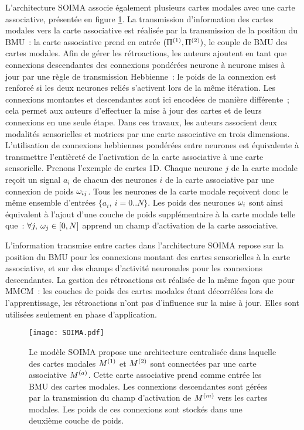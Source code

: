 \documentclass[../main]{subfiles}
\begin{document}
L'architecture SOIMA \parencite{escobar-juarez_self-organized_2016} associe également plusieurs cartes modales avec une carte associative, présentée en figure \ref{fig:SOIMA}.
La transmission d'information des cartes modales vers la carte associative est réalisée par la transmission de la position du BMU~: la carte associative prend en entrée $(\Pi^{({1})},\Pi^{({2})})$, le couple de BMU des cartes modales. 
Afin de gérer les rétroactions, les auteurs ajoutent en tant que connexions descendantes des connexions pondérées neurone à neurone mises à jour par une règle de transmission Hebbienne~: le poids de la connexion est renforcé si les deux neurones reliés s'activent lors de la même itération.
Les connexions montantes et descendantes sont ici encodées de manière différente~; cela permet aux auteurs d'effectuer la mise à jour des cartes et de leurs connexions en une seule étape. 
Dans ces travaux, les auteurs associent deux modalités sensorielles et motrices par une carte associative en trois dimensions.
L'utilisation de connexions hebbiennes pondérées entre neurones est équivalente à transmettre l'entièreté de l'activation de la carte associative à une carte sensorielle.
Prenons l'exemple de cartes 1D. Chaque neurone $j$ de la carte modale reçoit un signal $a_{i}$ de chacun des neurones $i$ de la carte associative par une connexion de poids $\omega_{ij}$. Tous les neurones de la carte modale reçoivent donc le même ensemble d'entrées $ \{a_{i},\: i = 0 .. N\}$.
Les poids des neurones $\omega_i$ sont ainsi équivalent à l'ajout d'une couche de poids supplémentaire à la carte modale telle que~: $\forall j, \: \omega_j \in [0,N]$ apprend un champ d'activation de la carte associative.

L'information transmise entre cartes dans l'architecture SOIMA repose sur la position du BMU pour les connexions montant des cartes sensorielles à la carte associative, et sur des champs d'activité neuronales pour les connexions descendantes.
La gestion des rétroactions est réalisée de la même façon que pour MMCM~: les couches de poids des cartes modales étant décorrélées lors de l'apprentissage, les rétroactions n'ont pas d'influence sur la mise à jour. Elles sont utilisées seulement en phase d'application.

\begin{figure}[t]
    \centering
    \texttt{[image: SOIMA.pdf]}
    \caption{Le modèle SOIMA \parencite{escobar-juarez_self-organized_2016} propose une architecture centralisée dans laquelle des cartes modales $M^{({1})}$ et $M^{({2})}$ sont connectées par une carte associative $M^{({a})}$. Cette carte associative prend comme entrée les BMU des cartes modales. 
    Les connexions descendantes sont gérées par la transmission du champ d'activation de $M^{({m})}$ vers les cartes modales. Les poids de ces connexions sont stockés dans une deuxième couche de poids.
    \label{fig:SOIMA}}
\end{figure}
\end{document}
